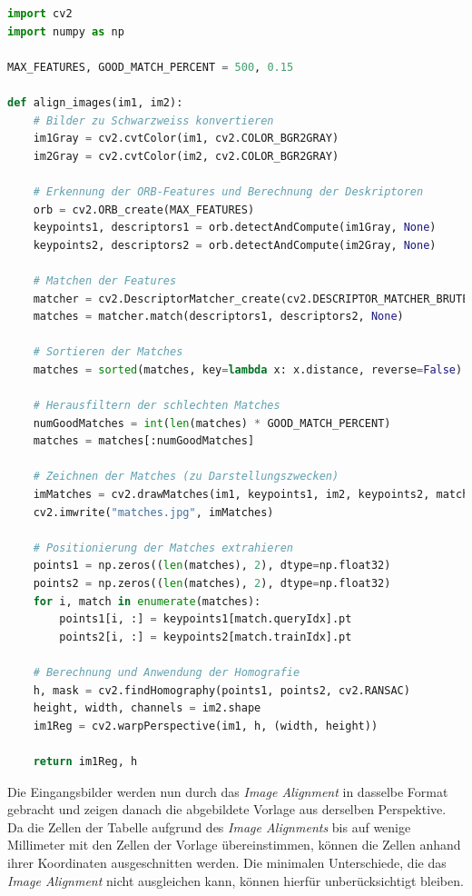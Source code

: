 \begin{minipage}{\textwidth}
	\begin{lstlisting}[language=Python, caption=Code für \textit{Image Alignment}, label=lst:align_images]
import cv2
import numpy as np

MAX_FEATURES, GOOD_MATCH_PERCENT = 500, 0.15

def align_images(im1, im2):
	# Bilder zu Schwarzweiss konvertieren
	im1Gray = cv2.cvtColor(im1, cv2.COLOR_BGR2GRAY)
	im2Gray = cv2.cvtColor(im2, cv2.COLOR_BGR2GRAY)

	# Erkennung der ORB-Features und Berechnung der Deskriptoren
	orb = cv2.ORB_create(MAX_FEATURES)
	keypoints1, descriptors1 = orb.detectAndCompute(im1Gray, None)
	keypoints2, descriptors2 = orb.detectAndCompute(im2Gray, None)

	# Matchen der Features
	matcher = cv2.DescriptorMatcher_create(cv2.DESCRIPTOR_MATCHER_BRUTEFORCE_HAMMING)
	matches = matcher.match(descriptors1, descriptors2, None)

	# Sortieren der Matches
	matches = sorted(matches, key=lambda x: x.distance, reverse=False)

	# Herausfiltern der schlechten Matches
	numGoodMatches = int(len(matches) * GOOD_MATCH_PERCENT)
	matches = matches[:numGoodMatches]

	# Zeichnen der Matches (zu Darstellungszwecken)
	imMatches = cv2.drawMatches(im1, keypoints1, im2, keypoints2, matches, None)
	cv2.imwrite("matches.jpg", imMatches)

	# Positionierung der Matches extrahieren
	points1 = np.zeros((len(matches), 2), dtype=np.float32)
	points2 = np.zeros((len(matches), 2), dtype=np.float32)
	for i, match in enumerate(matches):
		points1[i, :] = keypoints1[match.queryIdx].pt
		points2[i, :] = keypoints2[match.trainIdx].pt

	# Berechnung und Anwendung der Homografie
	h, mask = cv2.findHomography(points1, points2, cv2.RANSAC)
	height, width, channels = im2.shape
	im1Reg = cv2.warpPerspective(im1, h, (width, height))

	return im1Reg, h
	\end{lstlisting}
\end{minipage}

Die Eingangsbilder werden nun durch das \textit{Image Alignment} in dasselbe Format gebracht und zeigen danach die abgebildete Vorlage aus derselben Perspektive.
Da die Zellen der Tabelle aufgrund des \textit{Image Alignments} bis auf wenige Millimeter mit den Zellen der Vorlage übereinstimmen, können die Zellen
anhand ihrer Koordinaten ausgeschnitten werden. Die minimalen Unterschiede, die das \textit{Image Alignment} nicht ausgleichen kann, können hierfür unberücksichtigt
bleiben.

